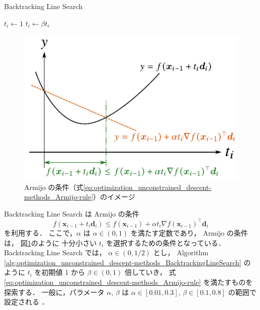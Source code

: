 \begin{algorithm}[tp]
    \caption{Backtracking Line Search \cite[Section 9.2]{Boyd2004}}
    \label{alg:optimization_unconstrained_descent-methods_BacktrackingLineSearch}
    \begin{algorithmic}
            \State $t_i \gets 1$
                \State $t_i \gets \beta t_i$
            \EndWhile
        \EndProcedure
    \end{algorithmic}
\end{algorithm}

\begin{figure}[tp]
    \centering
    \includegraphics[width=0.7\linewidth]{optimization/Armijo-rule-image.pdf}
    \caption{Armijo の条件（式\eqref{eq:optimization_unconstrained_descent-methods_Armijo-rule}）のイメージ}
    \label{fig:optimization_unconstrained_descent-methods_Armijo-rule-image}
\end{figure}

Backtracking Line Search \cite[Section 9.2]{Boyd2004} は
Armijo の条件 \cite[Section 7.5]{Luenberger2003}
\begin{equation}
    f(\bm{x}_{i-1} + t_i \bm{d}_i) \le f(\bm{x}_{i-1}) + \alpha t_i \nabla f(\bm{x}_{i-1})^\top \bm{d}_i
    \label{eq:optimization_unconstrained_descent-methods_Armijo-rule}
\end{equation}
を利用する．
ここで，$\alpha$ は $\alpha \in (0,1)$ を満たす定数であり，
Armijo の条件は，
図\ref{fig:optimization_unconstrained_descent-methods_Armijo-rule-image}のように
十分小さい $t_i$ を選択するための条件となっている．
Backtracking Line Search では，
$\alpha \in (0, 1/2)$ とし，
Algorithm \ref{alg:optimization_unconstrained_descent-methods_BacktrackingLineSearch}
のように
$t_i$ を初期値 1 から $\beta \in (0, 1)$ 倍していき，
式 \eqref{eq:optimization_unconstrained_descent-methods_Armijo-rule} を満たすものを探索する．
一般に，パラメータ $\alpha$, $\beta$ は
$\alpha \in [0.01, 0.3]$, $\beta \in [0.1, 0.8]$ の範囲で設定される
\cite[Section 9.2]{Boyd2004}．

